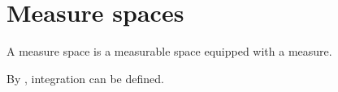\chapter{Measure spaces}

\begin{definition}
A measure space is a measurable space equipped with a measure.
\end{definition}

By , integration can be defined.
